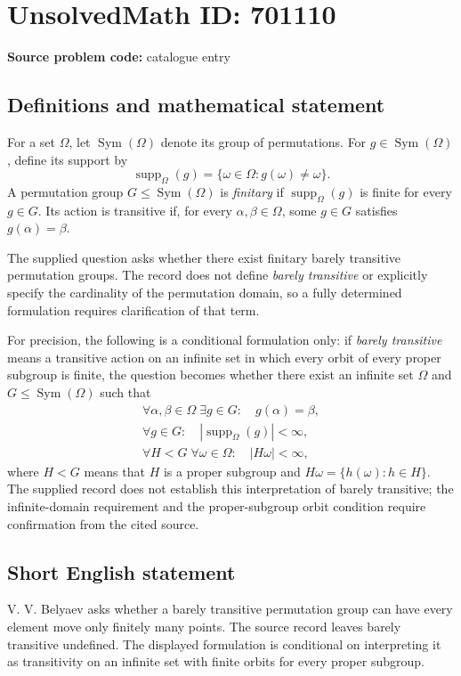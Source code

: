\documentclass[11pt]{article}
\begin{document}
\section*{UnsolvedMath ID: 701110}
\textbf{Source problem code:} catalogue entry
\subsection{Definitions and mathematical statement}
For a set \(\Omega\), let \(\operatorname{Sym}(\Omega)\) denote its group of permutations. For \(g\in\operatorname{Sym}(\Omega)\), define its support by
\[
\operatorname{supp}_{\Omega}(g)=\{\omega\in\Omega:g(\omega)\ne\omega\}.
\]
A permutation group \(G\leq\operatorname{Sym}(\Omega)\) is \emph{finitary} if \(\operatorname{supp}_{\Omega}(g)\) is finite for every \(g\in G\). Its action is transitive if, for every \(\alpha,\beta\in\Omega\), some \(g\in G\) satisfies \(g(\alpha)=\beta\).

The supplied question asks whether there exist finitary barely transitive permutation groups. The record does not define \emph{barely transitive} or explicitly specify the cardinality of the permutation domain, so a fully determined formulation requires clarification of that term.

For precision, the following is a conditional formulation only: if \emph{barely transitive} means a transitive action on an infinite set in which every orbit of every proper subgroup is finite, the question becomes whether there exist an infinite set \(\Omega\) and \(G\leq\operatorname{Sym}(\Omega)\) such that
\[
\begin{gathered}
\forall\alpha,\beta\in\Omega\;\exists g\in G:\quad g(\alpha)=\beta,\\
\forall g\in G:\quad |\operatorname{supp}_{\Omega}(g)|<\infty,\\
\forall H<G\;\forall\omega\in\Omega:\quad |H\omega|<\infty,
\end{gathered}
\]
where \(H<G\) means that \(H\) is a proper subgroup and \(H\omega=\{h(\omega):h\in H\}\). The supplied record does not establish this interpretation of barely transitive; the infinite-domain requirement and the proper-subgroup orbit condition require confirmation from the cited source.
\subsection{Short English statement}
V. V. Belyaev asks whether a barely transitive permutation group can have every element move only finitely many points. The source record leaves barely transitive undefined. The displayed formulation is conditional on interpreting it as transitivity on an infinite set with finite orbits for every proper subgroup.
\end{document}
